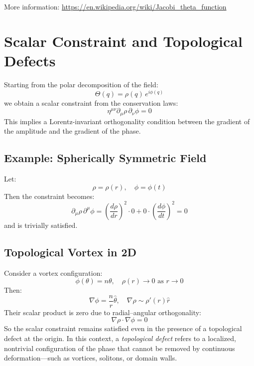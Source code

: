 \documentclass[12pt, a4paper]{article}
\begin{document}
More information: \url{https://en.wikipedia.org/wiki/Jacobi_theta_function}

\section{Scalar Constraint and Topological Defects}
Starting from the polar decomposition of the field:
\[
\Theta(q) = \rho(q)\, e^{i\phi(q)}
\]
we obtain a scalar constraint from the conservation laws:
\[
\eta^{\mu\nu} \partial_\mu \rho \, \partial_\nu \phi = 0
\]
This implies a Lorentz-invariant orthogonality condition between the gradient of the amplitude and the gradient of the phase.

\subsection*{Example: Spherically Symmetric Field}
Let:
\[
\rho = \rho(r), \quad \phi = \phi(t)
\]
Then the constraint becomes:
\[
\partial_\mu \rho \, \partial^\mu \phi = \left(\frac{d\rho}{dr}\right)^2 \cdot 0 + 0 \cdot \left(\frac{d\phi}{dt}\right)^2 = 0
\]
and is trivially satisfied.

\subsection*{Topological Vortex in 2D}
Consider a vortex configuration:
\[
\phi(\theta) = n\theta, \quad \rho(r) \to 0 \text{ as } r \to 0
\]
Then:
\[
\nabla \phi = \frac{n}{r} \hat{\theta}, \quad \nabla \rho \sim \rho'(r) \hat{r}
\]
Their scalar product is zero due to radial--angular orthogonality:
\[
\nabla \rho \cdot \nabla \phi = 0
\]
So the scalar constraint remains satisfied even in the presence of a topological defect at the origin. In this context, a \emph{topological defect} refers to a localized, nontrivial configuration of the phase that cannot be removed by continuous deformation---such as vortices, solitons, or domain walls.
\end{document}
